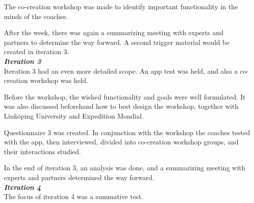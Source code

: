    The co-creation workshop was made to identify important functionality in the minds of the coaches.

   After the week, there was again a summarizing meeting with experts and partners to determine the way forward. A second trigger material would be created in iteration 3.\\

   \textit{\textbf{Iteration 3}}\\
   Iteration 3 had an even more detailed scope. An app test was held, and also a co-creation workshop was held.

   Before the workshop, the wished functionality and goals were well formulated. It was also discussed beforehand how to best design the workshop, together with Linköping University and Expedition Mondial.

   Questionnaire 3 was created. In conjunction with the workshop the coaches tested with the app, then interviewed, divided into co-creation workshop groups, and their interactions studied.

    In the end of iteration 3, an analysis was done, and a summarizing meeting with experts and partners determined the way forward.\\

    \textit{\textbf{Iteration 4}}\\
    The focus of iteration 4 was a summative test. \\
